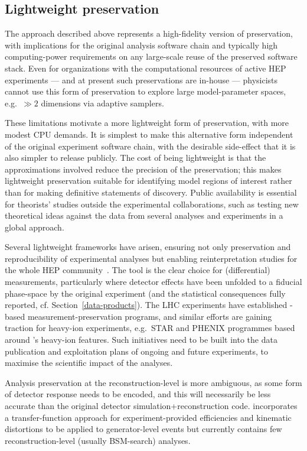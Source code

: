 \documentclass[11pt]{article}
\begin{document}
\subsection{Lightweight preservation}
\label{lightweight}

The approach described above represents a high-fidelity version of preservation, with implications for the original analysis software chain and typically high computing-power requirements on any large-scale reuse of the preserved software stack. Even for organizations with the computational resources of active HEP experiments --- and at present such preservations are in-house --- physicists cannot use this form of preservation to explore large model-parameter spaces, e.g.~$\gg 2$ dimensions via adaptive samplers.

These limitations motivate a more lightweight form of preservation, with more modest CPU demands. It is simplest to make this alternative form independent of the original experiment software chain, with the desirable side-effect that it is also simpler to release publicly. The cost of being lightweight is that the approximations involved reduce the precision of the preservation; this makes lightweight preservation suitable for identifying model regions of interest rather than for making definitive statements of discovery. Public availability is essential for theorists' studies outside the experimental collaborations, such as testing new theoretical ideas against the data from several analyses and experiments in a global approach.

Several lightweight frameworks have arisen, ensuring not only preservation and reproducibility of experimental analyses but enabling reinterpretation studies for the whole HEP community~\cite{LHCReinterpretationForum:2020xtr}. The \rivet tool is the clear choice for (differential) measurements, particularly where detector effects have been unfolded to a fiducial phase-space by the original experiment (and the statistical consequences fully reported, cf. Section~\ref{data-products}). The LHC experiments have established \rivet-based measurement-preservation programs, and similar efforts are gaining traction for heavy-ion experiments, e.g.~STAR and PHENIX programmes based around \rivet's heavy-ion features. Such initiatives need to be built into the data publication and exploitation plans of ongoing and future experiments, to maximise the scientific impact of the analyses.

Analysis preservation at the reconstruction-level is 
more ambiguous, as some form of detector response needs to be encoded, and this will necessarily be less accurate than the original detector simulation+reconstruction code. \rivet incorporates a transfer-function approach for experiment-provided efficiencies and kinematic distortions to be applied to generator-level events but currently contains few reconstruction-level (usually BSM-search) analyses.
\end{document}
